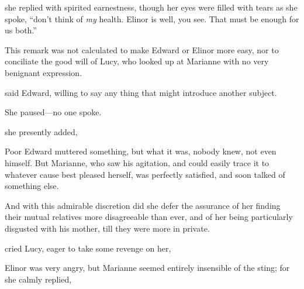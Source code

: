  she replied with spirited earnestness, though her eyes were filled with tears as she spoke, “don't think of {\em my} health. Elinor is well, you see. That must be enough for us both.”

This remark was not calculated to make Edward or Elinor more easy, nor to conciliate the good will of Lucy, who looked up at Marianne with no very benignant expression.

 said Edward, willing to say any thing that might introduce another subject.


She paused---no one spoke.

 she presently added, 

Poor Edward muttered something, but what it was, nobody knew, not even himself. But Marianne, who saw his agitation, and could easily trace it to whatever cause best pleased herself, was perfectly satisfied, and soon talked of something else.


And with this admirable discretion did she defer the assurance of her finding their mutual relatives more disagreeable than ever, and of her being particularly disgusted with his mother, till they were more in private.




 cried Lucy, eager to take some revenge on her, 

Elinor was very angry, but Marianne seemed entirely insensible of the sting; for she calmly replied,


